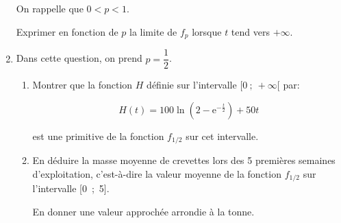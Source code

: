 \documentclass{cornouaille}
\begin{document}
\begin{exercice}
\begin{enumerate}
On rappelle que $0 < p < 1$.
	
Exprimer en fonction de $p$ la limite de $f_p$ lorsque $t$ tend vers $+ \infty$.
\item  Dans cette question, on prend $p = \dfrac{1}{2}$.
	\begin{enumerate}
		\item Montrer que la fonction $H$ définie sur l'intervalle $[0~;~ +\infty[$ par:

		\[H(t) = 100\ln \left(2 - \text{e}^{- \frac{t}{2}}\right) + 50t\]
		
est une primitive de la fonction $f_{1/2}$ sur cet intervalle.
		\item En déduire la masse moyenne de crevettes lors des 5 premières semaines d'exploitation, c'est-à-dire la valeur moyenne de la fonction $f_{1/2}$ sur l'intervalle [0~;~5].
		
En donner une valeur approchée arrondie à la tonne.
	\end{enumerate}
\end{enumerate}
\end{exercice}
\end{document}
